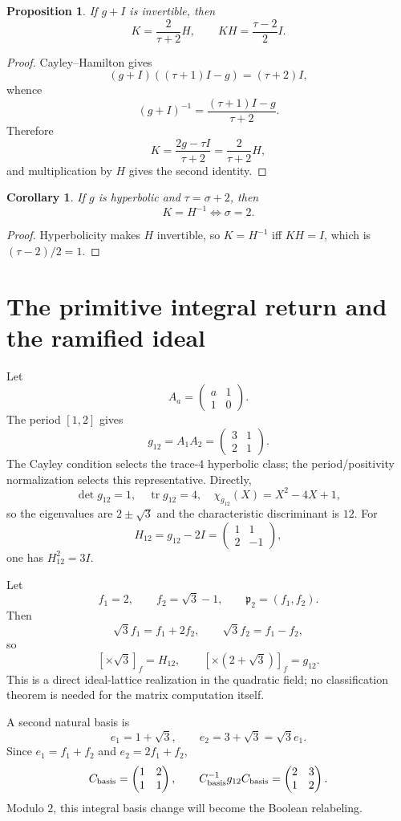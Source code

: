 \documentclass[11pt]{article}
\newtheorem{proposition}[theorem]{Proposition}
\newtheorem{corollary}[theorem]{Corollary}
\theoremstyle{remark}
\newcommand{\tr}{\operatorname{tr}}
\begin{document}
\begin{proposition}
If $g+I$ is invertible, then
\[
K=\frac{2}{\tau+2}H,
\qquad KH=\frac{\tau-2}{2}I.
\]
\end{proposition}
\begin{proof}
Cayley--Hamilton gives
\[
(g+I)((\tau+1)I-g)=(\tau+2)I,
\]
whence
\[
(g+I)^{-1}=\frac{(\tau+1)I-g}{\tau+2}.
\]
Therefore
\[
K=\frac{2g-\tau I}{\tau+2}=\frac{2}{\tau+2}H,
\]
and multiplication by $H$ gives the second identity.
\end{proof}

\begin{corollary}
If $g$ is hyperbolic and $\tau=\sigma+2$, then
\[
K=H^{-1}\iff\sigma=2.
\]
\end{corollary}
\begin{proof}
Hyperbolicity makes $H$ invertible, so $K=H^{-1}$ iff $KH=I$, which is
$(\tau-2)/2=1$.
\end{proof}

\section{The primitive integral return and the ramified ideal}

Let
\[
A_a=\begin{pmatrix}a&1\\1&0\end{pmatrix}.
\]
The period $[1,2]$ gives
\[
g_{12}=A_1A_2=\begin{pmatrix}3&1\\2&1\end{pmatrix}.
\]
The Cayley condition selects the trace-$4$ hyperbolic class; the
period/positivity normalization selects this representative.  Directly,
\[
\det g_{12}=1,
\quad \tr g_{12}=4,
\quad \chi_{g_{12}}(X)=X^2-4X+1,
\]
so the eigenvalues are $2\pm\sqrt3$ and the characteristic discriminant is
$12$.  For
\[
H_{12}=g_{12}-2I=\begin{pmatrix}1&1\\2&-1\end{pmatrix},
\]
one has $H_{12}^2=3I$.

Let
\[
f_1=2,
\qquad f_2=\sqrt3-1,
\qquad \mathfrak p_2=(f_1,f_2).
\]
Then
\[
\sqrt3 f_1=f_1+2f_2,
\qquad
\sqrt3 f_2=f_1-f_2,
\]
so
\[
[\times\sqrt3]_f=H_{12},
\qquad
[\times(2+\sqrt3)]_f=g_{12}.
\]
This is a direct ideal-lattice realization in the quadratic field; no
classification theorem is needed for the matrix computation itself.

A second natural basis is
\[
e_1=1+\sqrt3,
\qquad e_2=3+\sqrt3=\sqrt3 e_1.
\]
Since $e_1=f_1+f_2$ and $e_2=2f_1+f_2$,
\[
C_{\rm basis}=\begin{pmatrix}1&2\\1&1\end{pmatrix},
\qquad
C_{\rm basis}^{-1}g_{12}C_{\rm basis}
=\begin{pmatrix}2&3\\1&2\end{pmatrix}.
\]
Modulo $2$, this integral basis change will become the Boolean relabeling.
\end{document}
